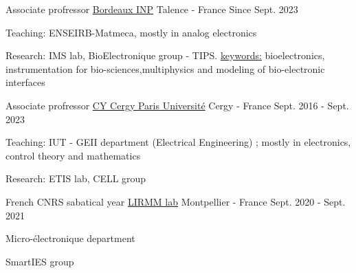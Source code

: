 

\begin{cventries}

\cventry
{Associate profressor} %
{\href{https://www.bordeaux-inp.fr/en}{Bordeaux INP}} %
{Talence - France} %
{Since Sept. 2023} %
{
  \begin{cvitems} %
    \item {Teaching: ENSEIRB-Matmeca, mostly in analog electronics}
    \item {Research: IMS lab, BioElectronique group - TIPS. \underline{keywords:} bioelectronics, instrumentation for bio-sciences,multiphysics and modeling of bio-electronic interfaces}
  \end{cvitems}
}

  \cventry
    {Associate profressor} %
    {\href{www.cyu.fr}{CY Cergy Paris Université}} %
    {Cergy - France} %
    {Sept. 2016 - Sept. 2023} %
    {
      \begin{cvitems} %
        \item {Teaching: IUT - GEII department (Electrical Engineering) ; mostly in electronics, control theory and mathematics}
        \item {Research: ETIS lab, CELL group}
      \end{cvitems}
    }
    
  \cventry
    {French CNRS sabatical year} %
    {\href{https://www.lirmm.fr}{LIRMM lab}} %
    {Montpellier - France} %
    {Sept. 2020 - Sept. 2021} %
    {
      \begin{cvitems} %
        \item {Micro-électronique department}
        \item {SmartIES group}
      \end{cvitems}
    }


\end{cventries}
